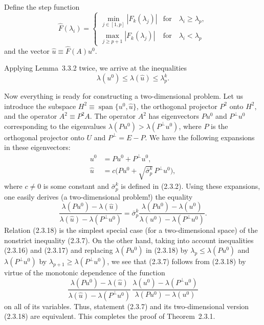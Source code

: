 \documentclass[11pt,oneside]{book}
\newcommand{\myspan}{\operatorname{span}}
\begin{document}
Define the step function
\[
\widehat{F}(\lambda_i) =
\begin{cases}
\min\limits_{j \in [1, p]} |F_k(\lambda_j)| & \text{for} \quad \lambda_i \geqslant \lambda_p, \\[2ex]
\max\limits_{j \geqslant p+1} |F_k(\lambda_j)| & \text{for} \quad \lambda_i < \lambda_p
\end{cases}
\]
and the vector $\hat{u} \equiv \widehat{F}(A) u^0$.

Applying Lemma~3.3.2 twice, we arrive at the inequalities %
\[
\lambda(u^0) \leqslant \lambda(\hat{u}) \leqslant \lambda_p^k. \tag{2.3.17}
\]

Now everything is ready for constructing a two-dimensional problem. Let us introduce the subspace $H^2 \equiv \myspan\{u^0, \hat{u}\}$, the orthogonal projector $P^2$ onto $H^2$, and the operator $A^2 \equiv P^2 A$. The operator $A^2$ has eigenvectors $P u^0$ and $P^\perp u^0$ corresponding to the eigenvalues $\lambda(P u^0) > \lambda(P^\perp u^0)$, where $P$ is the orthogonal projector onto $U$ and $P^\perp = E - P$. We have the following expansions in these eigenvectors:
\[
\begin{aligned}
u^0 &= P u^0 + P^\perp u^0, \\[1ex]
\hat{u} &= c\bigl(P u^0 + \sqrt{\bar{\sigma}_p^k}\, P^\perp u^0\bigr),
\end{aligned}
\]
where $c \neq 0$ is some constant and $\bar{\sigma}_p^k$ is defined in (2.3.2). Using these expansions, one easily derives (a two-dimensional problem!) the equality
\[
\frac{\lambda(P u^0) - \lambda(\hat{u})}{\lambda(\hat{u}) - \lambda(P^\perp u^0)} = \bar{\sigma}_p^k \frac{\lambda(P u^0) - \lambda(u^0)}{\lambda(u^0) - \lambda(P^\perp u^0)}. \tag{2.3.18}
\]
Relation (2.3.18) is the simplest special case (for a two-dimensional space) of the nonstrict inequality (2.3.7). On the other hand, taking into account inequalities (2.3.16) and (2.3.17) and replacing $\lambda(P u^0)$ in (2.3.18) by $\lambda_p \leqslant \lambda(P u^0)$ and $\lambda(P^\perp u^0)$ by $\lambda_{p+1} \geqslant \lambda(P^\perp u^0)$, we see that (2.3.7) follows from (2.3.18) by virtue of the monotonic dependence of the function
\[
\frac{\lambda(P u^0) - \lambda(\hat{u})}{\lambda(\hat{u}) - \lambda(P^\perp u^0)} \, \frac{\lambda(u^0) - \lambda(P^\perp u^0)}{\lambda(P u^0) - \lambda(u^0)}
\]
on all of its variables. Thus, statement (2.3.7) and its two-dimensional version (2.3.18) are equivalent. This completes the proof of Theorem~2.3.1.
\end{document}
